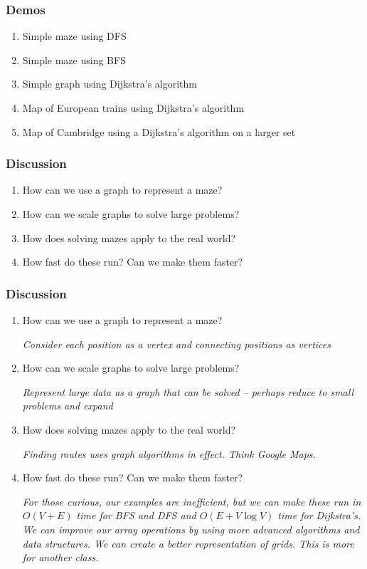 \documentclass{beamer}
\begin{document}
\begin{frame}
    \frametitle{Demos}

    \begin{enumerate}[(1)]
        \item Simple maze using DFS
        \item Simple maze using BFS
        \item Simple graph using Dijkstra's algorithm
        \item Map of European trains using Dijkstra's algorithm
        \item Map of Cambridge using a Dijkstra's algorithm on a larger set
    \end{enumerate}

\end{frame}

\begin{frame}
    \frametitle{Discussion}

    \begin{enumerate}[(1)]
        \item How can we use a graph to represent a maze?
        \item How can we scale graphs to solve large problems?
        \item How does solving mazes apply to the real world?
        \item How fast do these run? Can we make them faster?
    \end{enumerate}

\end{frame}


\begin{frame}
    \frametitle{Discussion}

    \begin{enumerate}[(1)]
        \item How can we use a graph to represent a maze?
        
        \textit{Consider each position as a vertex and connecting positions as vertices}
        \item How can we scale graphs to solve large problems?
        
        \textit{Represent large data as a graph that can be solved -- perhaps reduce to small problems and expand}

        \item How does solving mazes apply to the real world?

        \textit{Finding routes uses graph algorithms in effect. Think Google Maps.}

        \item How fast do these run? Can we make them faster?

        \textit{For those curious, our examples are inefficient, but we can make these run in $O(V+E)$ time for BFS and DFS and $O(E + V\log V)$ time for Dijkstra's. We can improve our array operations by using more advanced algorithms and data structures. We can create a better representation of grids. This is more for another class.}

    \end{enumerate}

\end{frame}
\end{document}
